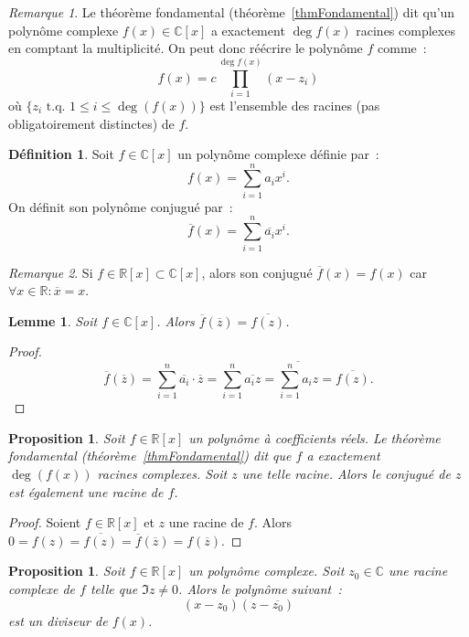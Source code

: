 \documentclass{article}
\newcommand{\R}{\mathbb R}
\newcommand{\C}{\mathbb C}
\newcommand{\tq}{\textrm{ t.q. }}
\newtheorem{prp}[thm]{Proposition}
\newtheorem{lem}[thm]{Lemme}
\theoremstyle{definition}
\newtheorem{déf}[thm]{Définition}
\theoremstyle{remark}
\newtheorem*{rmq}{Remarque}
\begin{document}
		\begin{rmq} Le théorème fondamental (théorème~\ref{thmFondamental}) dit qu'un polynôme complexe $f(x) \in \C[x]$ a exactement $\deg f(x)$ racines complexes en
		comptant la multiplicité. On peut donc réécrire le polynôme $f$ comme~: \[f(x) = c\prod_{i=1}^{\deg f(x)}(x-z_i)\] où $\{z_i \tq 1 \leq i \leq \deg(f(x))\}$ est
		l'ensemble des racines (pas obligatoirement distinctes) de $f$.\end{rmq}

		\begin{déf} Soit $f \in \C[x]$ un polynôme complexe définie par~: \[f(x) = \sum_{i=1}^na_ix^i.\] On définit son polynôme conjugué par~:
		\[\overline f(x) = \sum_{i=1}^n\overline {a_i}x^i.\] \end{déf}

		\begin{rmq} Si $f \in \R[x] \subset \C[x]$, alors son conjugué $\overline f(x) = f(x)$ car $\forall x \in \R : \overline x = x$. \end{rmq}

		\begin{lem} Soit $f \in \C[x]$. Alors $\overline f(\overline z) = \overline {f(z)}$. \end{lem}

		\begin{proof} \[\overline f(\overline z) = \sum_{i=1}^n\overline {a_i}\cdot\overline z = \sum_{i=1}^n\overline {a_iz} = \overline {\sum_{i=1}^na_iz} =
		\overline {f(z)}.\] \end{proof}

		\begin{prp} Soit $f \in \R[x]$ un polynôme à coefficients réels. Le théorème fondamental (théorème~\ref{thmFondamental}) dit que $f$ a exactement $\deg(f(x))$
		racines complexes. Soit $z$ une telle racine. Alors le conjugué de $z$ est également une racine de $f$. \end{prp}

		\begin{proof} Soient $f \in \R[x]$ et $z$ une racine de $f$. Alors $0 = f(z) = \overline {f(z)} = \overline f(\overline z) = f(\overline z)$. \end{proof}

		\begin{prp} Soit $f \in \R[x]$ un polynôme complexe. Soit $z_0 \in \C$ une racine complexe de $f$ telle que $\Im z \neq 0$. Alors le polynôme suivant~:
		\[(x-z_0)(z-\overline {z_0})\] est un diviseur de $f(x)$. \end{prp}
\end{document}
